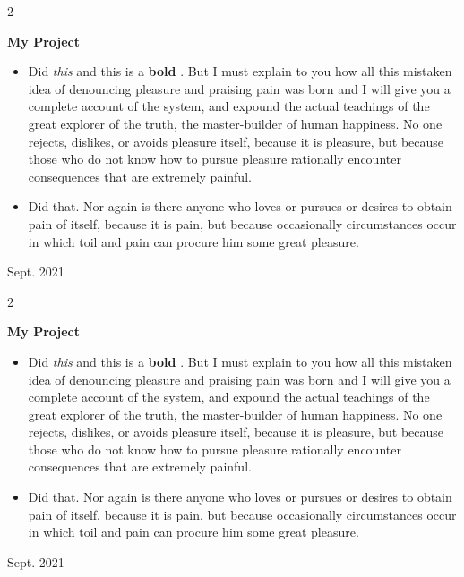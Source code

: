 \documentclass[10pt, letterpaper]{article}
\newenvironment{highlights}{
    \begin{itemize}[
        topsep=0.10 cm,
        parsep=0.10 cm,
        partopsep=0pt,
        itemsep=0pt,
        leftmargin=0.4 cm + 10pt
    ]
}{
    \end{itemize}
} %
\newenvironment{twocolentry}[2][]{
    \onecolentry
    \def\secondColumn{#2}
    \setcolumnwidth{\fill, 4.5 cm}
    \begin{paracol}{2}
}{
    \switchcolumn \raggedleft \secondColumn
    \end{paracol}
    \endonecolentry
} %
\let\hrefWithoutArrow\href
\renewcommand{\href}[2]{\hrefWithoutArrow{#1}{\mbox{\ifthenelse{\equal{#2}{}}{ }{#2 }\raisebox{.15ex}{\footnotesize \faExternalLink*}}}}
\begin{document}
        \vspace{0.2 cm}

        \begin{twocolentry}{
            Sept. 2021
        }
            \textbf{My Project}
            \begin{highlights}
                \item Did \textit{this} and this is a \textbf{bold} \href{https://example.com}{link}. But I must explain to you how all this mistaken idea of denouncing pleasure and praising pain was born and I will give you a complete account of the system, and expound the actual teachings of the great explorer of the truth, the master-builder of human happiness. No one rejects, dislikes, or avoids pleasure itself, because it is pleasure, but because those who do not know how to pursue pleasure rationally encounter consequences that are extremely painful.
                \item Did that. Nor again is there anyone who loves or pursues or desires to obtain pain of itself, because it is pain, but because occasionally circumstances occur in which toil and pain can procure him some great pleasure.
            \end{highlights}
        \end{twocolentry}


        \vspace{0.2 cm}

        \begin{twocolentry}{
            Sept. 2021
        }
            \textbf{My Project}
            \begin{highlights}
                \item Did \textit{this} and this is a \textbf{bold} \href{https://example.com}{link}. But I must explain to you how all this mistaken idea of denouncing pleasure and praising pain was born and I will give you a complete account of the system, and expound the actual teachings of the great explorer of the truth, the master-builder of human happiness. No one rejects, dislikes, or avoids pleasure itself, because it is pleasure, but because those who do not know how to pursue pleasure rationally encounter consequences that are extremely painful.
                \item Did that. Nor again is there anyone who loves or pursues or desires to obtain pain of itself, because it is pain, but because occasionally circumstances occur in which toil and pain can procure him some great pleasure.
            \end{highlights}
        \end{twocolentry}
\end{document}
